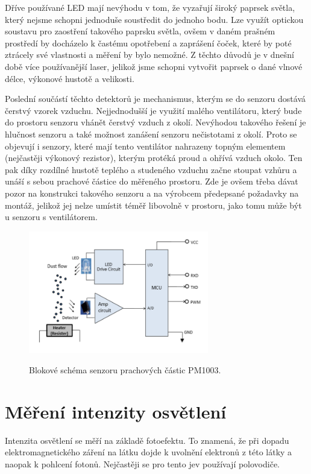 Dříve používané LED mají nevýhodu v tom, že vyzařují široký paprsek světla, který nejsme schopni jednoduše soustředit do jednoho bodu. Lze využít optickou soustavu pro zaostření takového paprsku světla, ovšem v daném prašném prostředí by docházelo k častému opotřebení a zaprášení čoček, které by poté ztrácely své vlastnosti a měření by bylo nemožné. Z těchto důvodů je v dnešní době více používanější laser, jelikož jsme schopni vytvořit paprsek o dané vlnové délce, výkonové hustotě a velikosti. 

Poslední součástí těchto detektorů je mechanismus, kterým se do senzoru dostává čerstvý vzorek vzduchu. Nejjednodušší je využití malého ventilátoru, který bude do prostoru senzoru vhánět čerstvý vzduch z okolí. Nevýhodou takového řešení je hlučnost senzoru a také možnost zanášení senzoru nečistotami z okolí. Proto se objevují i senzory, které mají tento ventilátor nahrazeny topným elementem (nejčastěji výkonový rezistor), kterým protéká proud a ohřívá vzduch okolo. Ten pak díky rozdílné hustotě teplého a studeného vzduchu začne stoupat vzhůru a unáší s sebou prachové částice do měřeného prostoru. Zde je ovšem třeba dávat pozor na konstrukci takového senzoru a na výrobcem předepsané požadavky na montáž, jelikož jej nelze umístit téměř libovolně v prostoru, jako tomu může být u senzoru s ventilátorem.

\begin{figure}
    \includegraphics[width=0.70\textwidth]{obrazky/dustSensorPrinciple.png}
    \label{fig_dustSensorPrinciple}
    \caption{Blokové schéma senzoru prachových částic PM1003.} %
\end{figure}

\section{Měření intenzity osvětlení}

Intenzita osvětlení se měří na základě fotoefektu. To znamená, že při dopadu elektromagnetického záření na látku dojde k uvolnění elektronů z této látky a naopak k pohlcení fotonů. Nejčastěji se pro tento jev používají polovodiče.

